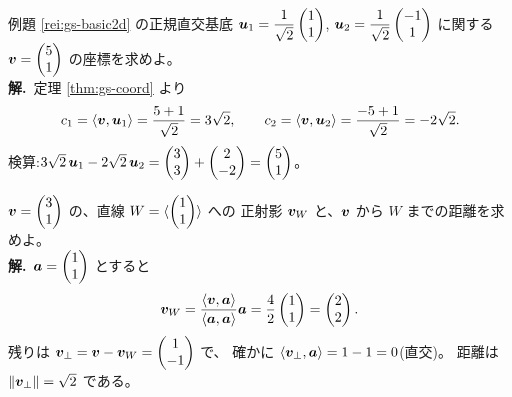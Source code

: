 \begin{rei}[例題・基本(座標計算)]\label{rei:gs-coordcalc}
例題 \ref{rei:gs-basic2d} の正規直交基底
$\bm{u}_1 = \dfrac{1}{\sqrt{2}}\begin{pmatrix}1 \\ 1\end{pmatrix}$,
$\bm{u}_2 = \dfrac{1}{\sqrt{2}}\begin{pmatrix}-1 \\ 1\end{pmatrix}$ に関する
$\bm{v} = \begin{pmatrix}5 \\ 1\end{pmatrix}$ の座標を求めよ。\\
\textbf{解.}\ 定理 \ref{thm:gs-coord} より
\[
c_1 = \langle \bm{v}, \bm{u}_1 \rangle = \frac{5 + 1}{\sqrt{2}} = 3\sqrt{2},
\qquad
c_2 = \langle \bm{v}, \bm{u}_2 \rangle = \frac{-5 + 1}{\sqrt{2}} = -2\sqrt{2}.
\]
検算:$3\sqrt{2}\,\bm{u}_1 - 2\sqrt{2}\,\bm{u}_2
= \begin{pmatrix}3 \\ 3\end{pmatrix} + \begin{pmatrix}2 \\ -2\end{pmatrix} = \begin{pmatrix}5 \\ 1\end{pmatrix}$。
\end{rei}

\begin{rei}[例題・基本(直線への正射影)]\label{rei:gs-projline}
$\bm{v} = \begin{pmatrix}3 \\ 1\end{pmatrix}$ の、直線 $W = \langle \begin{pmatrix}1 \\ 1\end{pmatrix} \rangle$ への
正射影 $\bm{v}_W$ と、$\bm{v}$ から $W$ までの距離を求めよ。\\
\textbf{解.}\ $\bm{a} = \begin{pmatrix}1 \\ 1\end{pmatrix}$ とすると
\[
\bm{v}_W = \frac{\langle \bm{v}, \bm{a} \rangle}{\langle \bm{a}, \bm{a} \rangle}
\bm{a} = \frac{4}{2}\begin{pmatrix}1 \\ 1\end{pmatrix} = \begin{pmatrix}2 \\ 2\end{pmatrix}.
\]
残りは $\bm{v}_{\perp} = \bm{v} - \bm{v}_W = \begin{pmatrix}1 \\ -1\end{pmatrix}$ で、
確かに $\langle \bm{v}_{\perp}, \bm{a} \rangle = 1 - 1 = 0$(直交)。
距離は $\|\bm{v}_{\perp}\| = \sqrt{2}$ である。
\end{rei}

